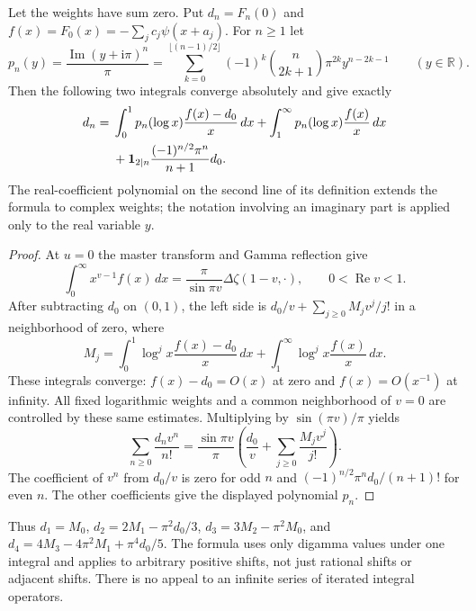\begin{theorem}
Let the weights have sum zero. Put $d_n=F_n(0)$ and
$f(x)=F_0(x)=-\sum_jc_j\psi(x+a_j)$. For $n\ge1$ let
\[
 p_n(y)=\frac{\operatorname{Im}(y+\mathrm i\pi)^n}{\pi}
 =\sum_{k=0}^{\lfloor(n-1)/2\rfloor}
 (-1)^k\binom n{2k+1}\pi^{2k}y^{n-2k-1}
 \qquad(y\in\mathbb R).
\]
Then the following two integrals converge absolutely and give exactly
\begin{align}\label{stmell:digamma-reconstruct}
 d_n={}&\int_0^1p_n(\log x)\frac{f(x)-d_0}{x}\,dx
       +\int_1^\infty p_n(\log x)\frac{f(x)}x\,dx\notag\\
 &+\mathbf1_{2\mid n}\frac{(-1)^{n/2}\pi^n}{n+1}d_0.
\end{align}
The real-coefficient polynomial on the second line of its definition
extends the formula to complex weights; the notation involving an
imaginary part is applied only to the real variable $y$.
\end{theorem}
\begin{proof}
At $u=0$ the master transform and Gamma reflection give
\[
 \int_0^\infty x^{v-1}f(x)\,dx
 =\frac{\pi}{\sin\pi v}\Delta\zeta(1-v,\cdot),
 \qquad0<\operatorname{Re}v<1.
\]
After subtracting $d_0$ on $(0,1)$, the left side is
$d_0/v+\sum_{j\ge0}M_jv^j/j!$ in a neighborhood of zero, where
\[
 M_j=\int_0^1\log^j x\frac{f(x)-d_0}{x}\,dx
       +\int_1^\infty\log^j x\frac{f(x)}x\,dx.
\]
These integrals converge: $f(x)-d_0=O(x)$ at zero and
$f(x)=O(x^{-1})$ at infinity. All fixed logarithmic weights and a
common neighborhood of $v=0$ are controlled by these same estimates.
Multiplying by $\sin(\pi v)/\pi$ yields
\[
 \sum_{n\ge0}\frac{d_nv^n}{n!}
 =\frac{\sin\pi v}{\pi}
     \left(\frac{d_0}v+\sum_{j\ge0}\frac{M_jv^j}{j!}\right).
\]
The coefficient of $v^n$ from $d_0/v$ is zero for odd $n$ and
$(-1)^{n/2}\pi^nd_0/(n+1)!$ for even $n$.
The other coefficients give the displayed polynomial $p_n$.
\end{proof}

Thus $d_1=M_0$, $d_2=2M_1-\pi^2d_0/3$,
$d_3=3M_2-\pi^2M_0$, and
$d_4=4M_3-4\pi^2M_1+\pi^4d_0/5$.
The formula uses only digamma values under one integral and applies to
arbitrary positive shifts, not just rational shifts or adjacent shifts.
There is no appeal to an infinite series of iterated integral operators.

